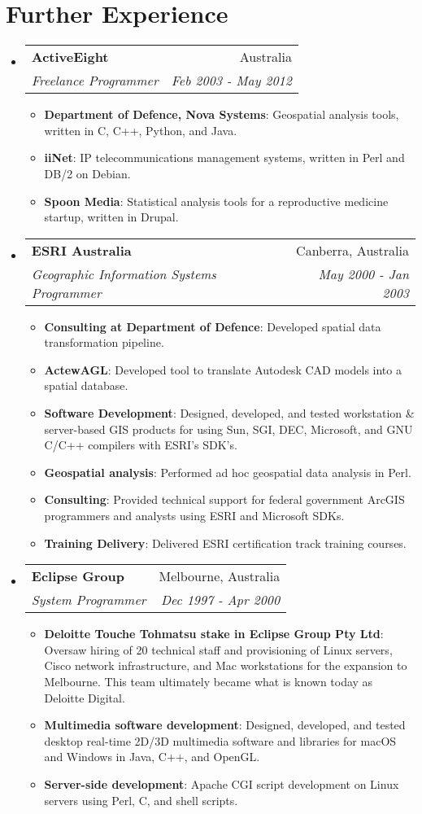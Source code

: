 \documentclass[11pt]{article}
\makeatletter
\newcommand{\resumeItem}[2]{
  \item\small{
    \textbf{#1}{: #2 \vspace{-2pt}}
  }
}
\newcommand{\resumeSubheading}[4]{
  \vspace{-1pt}\item
    \begin{tabular*}{0.97\textwidth}[t]{l@{\extracolsep{\fill}}r}
      \textbf{#1} & #2 \\
      \textit{\small#3} & \textit{\small #4} \\
    \end{tabular*}\vspace{-5pt}
}
\newcommand{\resumeSubHeadingListStart}{\begin{itemize}[leftmargin=*]}
\newcommand{\resumeSubHeadingListEnd}{\end{itemize}}
\newcommand{\resumeItemListStart}{\begin{itemize}}
\newcommand{\resumeItemListEnd}{\end{itemize}\vspace{-5pt}}
\makeatother
\begin{document}
\section{Further Experience}
  \resumeSubHeadingListStart
    \resumeSubheading
        {ActiveEight}{Australia}
        {Freelance Programmer}{Feb 2003 - May 2012}
        \resumeItemListStart
          \resumeItem{Department of Defence, Nova Systems}
            {Geospatial analysis tools, written in C, C++, Python, and Java.}
          \resumeItem{iiNet}
            {IP telecommunications management systems, written in Perl and DB/2 on Debian.}
          \resumeItem{Spoon Media}
            {Statistical analysis tools for a reproductive medicine startup, written in Drupal.}
        \resumeItemListEnd

    \resumeSubheading
      {ESRI Australia}{Canberra, Australia}
      {Geographic Information Systems Programmer}{May 2000 - Jan 2003}
        \resumeItemListStart
          \resumeItem{Consulting at Department of Defence}
            {Developed spatial data transformation pipeline.}
          \resumeItem{ActewAGL}
            {Developed tool to translate Autodesk CAD models into a spatial database.}
          \resumeItem{Software Development}
            {Designed, developed, and tested workstation \& server-based GIS products for using Sun, SGI, DEC, Microsoft, and GNU C/C++ compilers with ESRI's SDK's.}
          \resumeItem{Geospatial analysis}
            {Performed ad hoc geospatial data analysis in Perl.}
          \resumeItem{Consulting}
            {Provided technical support for federal government ArcGIS programmers and analysts using ESRI and Microsoft SDKs.}
          \resumeItem{Training Delivery}
            {Delivered ESRI certification track training courses.}
        \resumeItemListEnd

    \resumeSubheading
      {Eclipse Group}{Melbourne, Australia}
      {System Programmer}{Dec 1997 - Apr 2000}
        \resumeItemListStart
        \resumeItem{Deloitte Touche Tohmatsu stake in Eclipse Group Pty Ltd}
          {Oversaw hiring of 20 technical staff and provisioning of Linux servers, Cisco network infrastructure, and Mac workstations for the expansion to Melbourne. This team ultimately became what is known today as Deloitte Digital.}
        \resumeItem{Multimedia software development}
          {Designed, developed, and tested desktop real-time 2D/3D multimedia software and libraries for macOS and Windows in Java, C++, and OpenGL.}
        \resumeItem{Server-side development}
          {Apache CGI script development on Linux servers using Perl, C, and shell scripts.}
        \resumeItemListEnd
    \resumeSubHeadingListEnd
\end{document}
